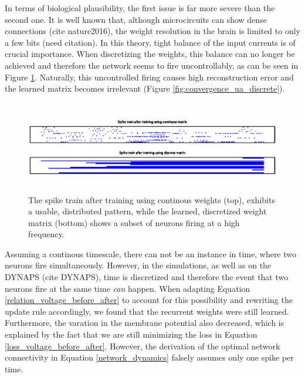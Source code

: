 \documentclass[twoside,11pt]{article}
\begin{document}
In terms of biological plausibility, the first issue is far more severe than the second one. It is well
known that, although microcircuits can show dense connections (cite nature2016), the weight resolution
in the brain is limited to only a few bits (need citation). In this theory, tight balance of the input
currents is of crucial importance. When discretizing the weights, this balance can no longer
be achieved and therefore the network seems to fire uncontrollably, as can be seen in Figure
\ref{fig:discrete_spike_trains}. Naturally, this uncontrolled firing causes high reconstruction
error and the learned matrix becomes irrelevant (Figure \ref{fig:convergence_ua_discrete}).

\begin{figure}[!htb]
  \includegraphics[width = \columnwidth, height=4cm]{figures/spike_train_cont_vs_disc.eps}
  \caption{The spike train after training using continous weights (top), exhibits a usable,
  distributed pattern, while the learned, discretized weight matrix (bottom) shows a subset
  of neurons firing at a high frequency.}
  \label{fig:discrete_spike_trains}
\end{figure}

Assuming a continous timescale, there can not be an instance in time, where two neurons fire simultaneously.
However, in the simulations, as well as on the DYNAPS (cite DYNAPS), time is discretized and therefore
the event that two neurons fire at the same time \emph{can} happen.
When adapting Equation \ref{relation_voltage_before_after} to account for this possibility and rewriting
the update rule accordingly, we found that the recurrent weights were still learned. Furthermore, the
varation in the membrane potential also decreased, which is explained by the fact that we are still
minimizing the loss in Equation \ref{loss_voltage_before_after}.
However, the derivation of the optimal network connectivity
in Equation \ref{network_dynamics} falsely assumes only one spike per time.
\newpage
\end{document}
